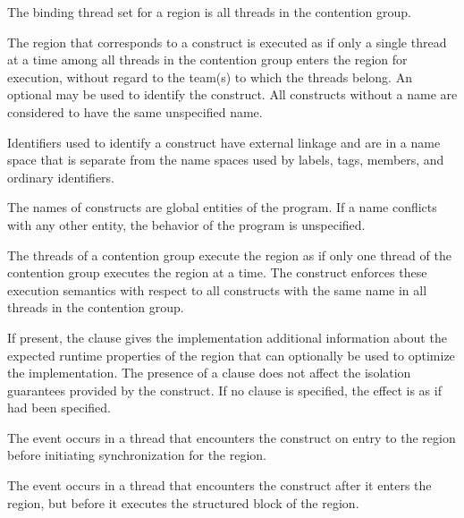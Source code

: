 \binding
The binding thread set for a  region is all threads in the contention group.

\descr
The region that corresponds to a  construct is executed as if only 
a single thread at a time among all threads in the contention group enters the 
region for execution, without regard to the team(s) to which the threads belong.
An optional  may be used to identify the  construct. All 
 constructs without a name are considered to have the same 
unspecified name.

\begin{ccppspecific}
Identifiers used to identify a  construct have external linkage and are in a
name space that is separate from the name spaces used by labels, tags, members, and
ordinary identifiers.
\end{ccppspecific}

\begin{fortranspecific}
The names of  constructs are global entities of the program. If a name
conflicts with any other entity, the behavior of the program is unspecified.
\end{fortranspecific}

The threads of a contention group execute the  region as if only one 
thread of the contention group executes the  region at a time.
The  construct enforces these execution semantics with respect to all 
 constructs with the same name in all threads in the contention group.

If present, the  clause gives the implementation additional
information about the expected runtime properties of the  region
that can optionally be used to optimize the implementation.
The presence of a  clause does not affect the isolation
guarantees provided by the  construct. If no  
clause is specified, the effect is as if 
had been specified.

\events
The  event occurs in a thread that encounters the
 construct on entry to the  region before
initiating synchronization for the region.

The  event occurs in a thread that encounters the
 construct after it enters the region, but before it executes 
the structured block of the  region.

